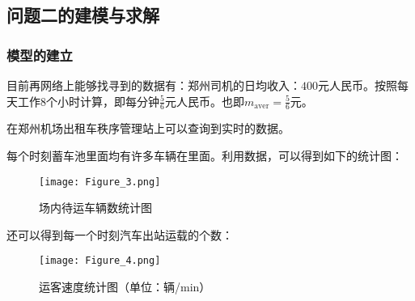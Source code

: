 \documentclass[withoutpreface,bwprint]{cumcmthesis} %
\begin{document}
\newpage
\subsection{问题二的建模与求解}

\subsubsection{模型的建立}
目前再网络上能够找寻到的数据有：郑州司机的日均收入：$400$元人民币。按照每天工作$8$个小时计算，即每分钟$\frac{5}{6}$元人民币。也即$m_{\mathrm{aver} }= \frac{5}{6}$元。\par
在郑州机场出租车秩序管理站上可以查询到实时的数据。\par
每个时刻蓄车池里面均有许多车辆在里面。利用数据，可以得到如下的统计图：\par
\begin{figure}[!h]
	\centering
	\texttt{[image: Figure\_3.png]}
	\caption{场内待运车辆数统计图}
\end{figure}
还可以得到每一个时刻汽车出站运载的个数：\par
\begin{figure}[!h]
	\centering
	\texttt{[image: Figure\_4.png]}
	\caption{运客速度统计图（单位：辆/min）}
\end{figure}
\end{document}

